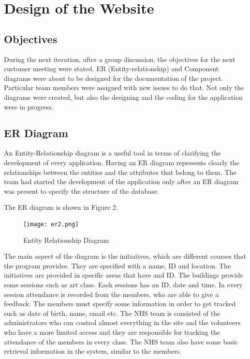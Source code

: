 \documentclass{l3proj}
\begin{document}
\section{Design of the Website}
\label{sec:design}

\subsection{Objectives}
\label{sec:objectives}

During the next iteration, after a group discussion, the objectives for the next customer meeting were stated. ER (Entity-relationship) and Component diagrams were about to be designed for the documentation of the project. Particular team members were assigned with new issues to do that. Not only the diagrams were created, but also the designing and the coding for the application were in progress. 

\subsection{ER Diagram}
\label{sec:er}

An Entity-Relationship diagram \cite{er} is a useful tool in terms of clarifying the development of every application. Having an ER diagram represents clearly the relationships between the entities and the attributes that belong to them. The team had started the development of the application only after an ER diagram was present to specify the structure of the database.

The ER diagram is shown in Figure 2.

\begin{figure}
\centerline{\texttt{[image: er2.png]}}
\caption{Entity Relationship Diagram}
\label{fig:er}
\end{figure}

The main aspect of the diagram is the initiatives, which are different courses that the program provides. They are specified with a name, ID and location. The initiatives are provided in specific areas that have and ID. The buildings provide some sessions such as art class. Each sessions has an ID, date and time. In every session attendance is recorded from the members, who are able to give a feedback. The members must specify some information in order to get tracked such us date of birth, name, email etc. The NHS team is consisted of the administrators who can control almost everything in the site and the volunteers who have a more limited access and they are responsible for tracking the attendance of the members in every class. The NHS team also have some basic retrieval information in the system, similar to the members.
\end{document}
